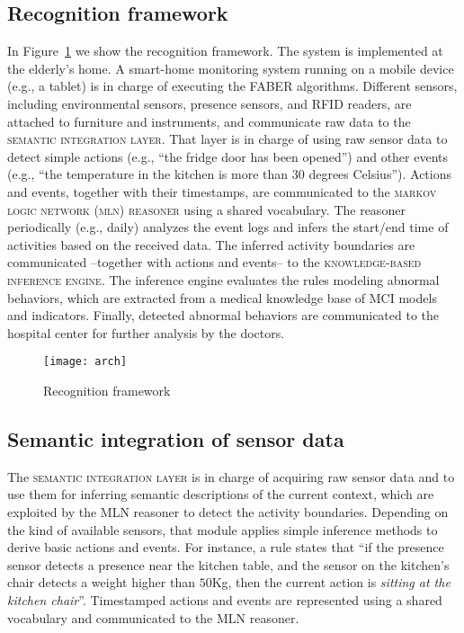 \documentclass[10pt, conference, compsocconf]{IEEEtran}
\begin{document}
\subsection{Recognition framework}
\label{subsec:framework}
In Figure~\ref{fig:arch} we show the recognition framework. 
The system is implemented at the elderly's 
home. A smart-home monitoring system running on a mobile device
(e.g., a tablet) is in charge of executing the
FABER algorithms. 
Different sensors, including environmental sensors, presence
sensors, and RFID readers, are attached to furniture and 
instruments, and communicate raw data to the 
\textsc{semantic integration layer}. 
That layer is in charge of using raw sensor data to 
detect simple actions (e.g., ``the fridge door has been opened'')
and other events (e.g., ``the temperature in the kitchen
is more than 30 degrees Celsius''). Actions and events, together
with their timestamps, are communicated to the 
\textsc{markov logic network (mln) reasoner} using a shared vocabulary.
The reasoner periodically (e.g., daily) analyzes the event logs and 
infers the start/end time of activities based on the received data.
The inferred activity boundaries are communicated --together with 
actions and events-- to the \textsc{knowledge-based inference engine}. 
The inference engine evaluates the rules modeling abnormal behaviors, 
which are extracted from a medical knowledge base of MCI models and 
indicators.
Finally, detected abnormal behaviors are communicated to the hospital
center for further analysis by the doctors.
\begin{figure}[t!]
  \centering
     \texttt{[image: arch]}
  \caption{Recognition framework}
  \label{fig:arch}
\end{figure}


\subsection{Semantic integration of sensor data}
\label{subsec:semint}
The \textsc{semantic integration layer} is in charge of acquiring
raw sensor data and to use them for inferring semantic
descriptions of the current context, which are exploited by the 
MLN reasoner to detect the activity boundaries.
Depending on the kind of available sensors, that module applies
simple inference methods to derive basic actions and events. 
For instance, a rule states that ``if the presence sensor detects 
a presence near the kitchen table, and the sensor on the kitchen's 
chair detects a weight higher than $50$Kg, then the current action 
is \emph{sitting at the kitchen chair}''.
Timestamped actions and events are represented using a shared vocabulary
and communicated to the MLN reasoner.
\end{document}
